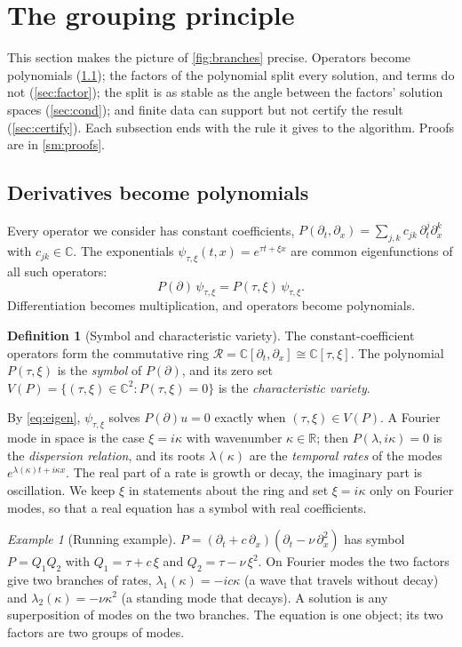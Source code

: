 \documentclass[11pt]{article}
\theoremstyle{plain}
\theoremstyle{definition}
\newtheorem{definition}[theorem]{Definition}
\theoremstyle{remark}
\newtheorem{example}[theorem]{Example}
\newcommand{\R}{\mathbb{R}}
\newcommand{\C}{\mathbb{C}}
\newcommand{\ring}{\mathcal{R}}            %
\newcommand{\Var}{V}                        %
\newcommand{\SMproofs}{\cref{sm:proofs}}
\begin{document}
\section{The grouping principle}\label{sec:theory}
This section makes the picture of \cref{fig:branches} precise. Operators become polynomials (\cref{sec:ring}); the
factors of the polynomial split every solution, and terms do not (\cref{sec:factor}); the split is as stable as the angle
between the factors' solution spaces (\cref{sec:cond}); and finite data can support but not certify the result
(\cref{sec:certify}). Each subsection ends with the rule it gives to the algorithm. Proofs are in \SMproofs.

\subsection{Derivatives become polynomials}\label{sec:ring}
Every operator we consider has constant coefficients,
$P(\partial_t,\partial_x)=\sum_{j,k}c_{jk}\,\partial_t^j\partial_x^k$ with $c_{jk}\in\C$. The exponentials $\psi_{\tau,\xi}(t,x)=e^{\tau t+\xi x}$ are common eigenfunctions of all such operators:
\begin{equation}\label{eq:eigen}
  P(\partial)\,\psi_{\tau,\xi}=P(\tau,\xi)\,\psi_{\tau,\xi}.
\end{equation}
Differentiation becomes multiplication, and operators become polynomials.

\begin{definition}[Symbol and characteristic variety]\label{def:ring}
The constant-coefficient operators form the commutative ring $\ring=\C[\partial_t,\partial_x]\cong\C[\tau,\xi]$. The
polynomial $P(\tau,\xi)$ is the \emph{symbol} of $P(\partial)$, and its zero set
$\Var(P)=\{(\tau,\xi)\in\C^2:P(\tau,\xi)=0\}$ is the \emph{characteristic variety}.
\end{definition}

By \eqref{eq:eigen}, $\psi_{\tau,\xi}$ solves $P(\partial)u=0$ exactly when $(\tau,\xi)\in\Var(P)$. A Fourier mode in
space is the case $\xi=i\kappa$ with wavenumber $\kappa\in\R$; then $P(\lambda,i\kappa)=0$ is the \emph{dispersion
relation}, and its roots $\lambda(\kappa)$ are the \emph{temporal rates} of the modes $e^{\lambda(\kappa)t+i\kappa x}$.
The real part of a rate is growth or decay, the imaginary part is oscillation. We keep $\xi$ in statements about the
ring and set $\xi=i\kappa$ only on Fourier modes, so that a real equation has a symbol with real coefficients.

\begin{example}[Running example]\label{ex:running}
$P=(\partial_t+c\,\partial_x)(\partial_t-\nu\,\partial_x^2)$ has symbol $P=Q_1Q_2$ with $Q_1=\tau+c\,\xi$ and
$Q_2=\tau-\nu\,\xi^2$. On Fourier modes the two factors give two branches of rates, $\lambda_1(\kappa)=-ic\kappa$ (a
wave that travels without decay) and $\lambda_2(\kappa)=-\nu\kappa^2$ (a standing mode that decays). A solution is any
superposition of modes on the two branches. The equation is one object; its two factors are two groups of modes.
\end{example}
\end{document}
